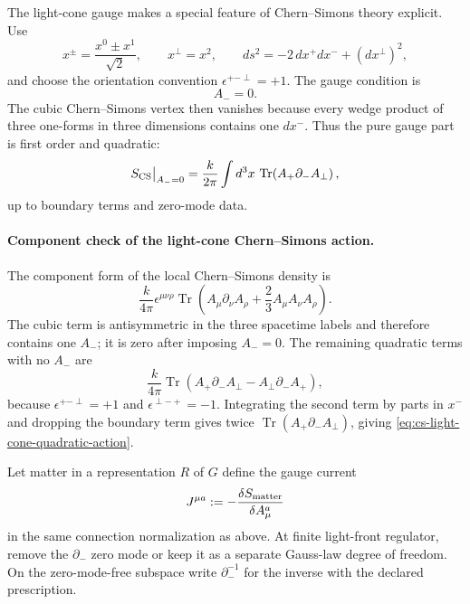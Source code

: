 The light-cone gauge makes a special feature of Chern--Simons theory explicit.
Use
\begin{equation}
  x^\pm=\frac{x^0\pm x^1}{\sqrt2},\qquad x^\perp=x^2,\qquad
  ds^2=-2\,dx^+dx^-+(dx^\perp)^2,
  \label{eq:cs-light-cone-coordinates}
\end{equation}
and choose the orientation convention
\(\epsilon^{+-\perp}=+1\).  The gauge condition is
\begin{equation}
  A_-=0.
  \label{eq:cs-light-cone-gauge}
\end{equation}
The cubic Chern--Simons vertex then vanishes because every wedge product of
three one-forms in three dimensions contains one \(dx^-\).  Thus the pure gauge
part is first order and quadratic:
\begin{equation}
  S_{\rm CS}\big|_{A_-=0}
  =
  \frac{k}{2\pi}
  \int d^3x\,\operatorname{Tr}\!\left(A_+\partial_-A_\perp\right),
  \label{eq:cs-light-cone-quadratic-action}
\end{equation}
up to boundary terms and zero-mode data.

\paragraph{Component check of the light-cone Chern--Simons action.}
The component form of the local Chern--Simons density is
\[
  \frac{k}{4\pi}\epsilon^{\mu\nu\rho}
  \operatorname{Tr}\!\left(
    A_\mu\partial_\nu A_\rho
    +\frac23 A_\mu A_\nu A_\rho
  \right).
\]
The cubic term is antisymmetric in the three spacetime labels and therefore
contains one \(A_-\); it is zero after imposing \(A_-=0\).  The remaining
quadratic terms with no \(A_-\) are
\[
  \frac{k}{4\pi}
  \operatorname{Tr}\!\left(
    A_+\partial_-A_\perp
    -A_\perp\partial_-A_+
  \right),
\]
because \(\epsilon^{+-\perp}=+1\) and
\(\epsilon^{\perp-+}=-1\).  Integrating the second term by parts in \(x^-\)
and dropping the boundary term gives twice
\(\operatorname{Tr}(A_+\partial_-A_\perp)\), giving
\eqref{eq:cs-light-cone-quadratic-action}.

Let matter in a representation \(R\) of \(G\) define the gauge current
\[
  J^{\mu a}:=-\frac{\delta S_{\rm matter}}{\delta A_\mu^a}
\]
in the same connection normalization as above.  At finite light-front
regulator, remove the \(\partial_-\) zero mode or keep it as a separate
Gauss-law degree of freedom.  On the zero-mode-free subspace write
\(\partial_-^{-1}\) for the inverse with the declared prescription.

